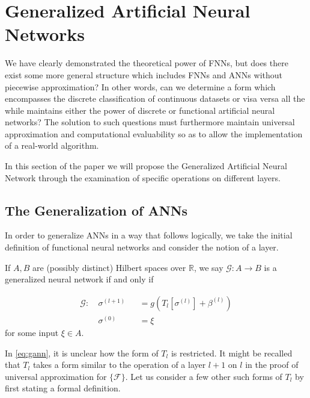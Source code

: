 
\section{Generalized Artificial Neural Networks}



We have clearly demonstrated the theoretical power of FNNs, but does there exist some more general structure which includes FNNs and ANNs without piecewise approximation? In other words, can we determine a form which encompasses the discrete classification of continuous datasets or visa versa all the while maintains either the power of discrete or functional artificial neural networks? The solution to such questions must furthermore maintain universal approximation and computational evaluability so as to allow the implementation of a real-world algorithm. 

In this section of the paper we will propose the Generalized Artificial Neural Network through the examination of specific operations on different layers. 

\subsection{The Generalization of ANNs}
In order to generalize ANNs in a way that follows logically, we take the initial definition of functional neural networks and consider the notion of a layer.
\begin{definition} If $A,B$ are (possibly distinct) Hilbert spaces over $\mathbb{R}$,
we say $\mathcal{G}: A \to B$ is a generalized neural network if and only if 

\begin{equation} \label{eq:gann}
          \begin{alignedat}{2}
        \mathcal{G}:\ &\sigma^{(l+1)} & &=  g\left(T_l\left[\sigma^{(l)}\right] + \beta^{(l)}\right)  \\
        &\sigma^{(0)} & &= \xi 
        \end{alignedat}
\end{equation}
for some input $\xi \in A$.
\end{definition}

In \eqref{eq:gann}, it is unclear how the form of $T_l$ is restricted. It might be recalled that $T_l$ takes a form similar to the operation of a layer $l+1$ on $l$ in the proof of universal approximation for $\{\mathcal{F}\}$. Let us consider a few other such forms of $T_l$ by first stating a formal definition.

